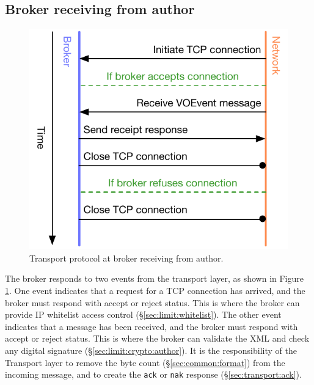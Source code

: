\documentclass[a4paper,11pt]{ivoa}
\begin{document}
\subsection{Broker receiving from author}

\begin{figure}[H]
  \begin{center}
  \includegraphics{figures/brokerfromauthor.pdf}
  \end{center}

  \caption{Transport protocol at broker receiving from author.}

  \label{fig:protocol:brokerfromauthor}
\end{figure}

The broker responds to two events from the transport layer, as shown in Figure
\ref{fig:protocol:brokerfromauthor}. One event indicates that a request for a
TCP connection has arrived, and the broker must respond with accept or reject
status. This is where the broker can provide IP whitelist access control
(\S\ref{sec:limit:whitelist}). The other event indicates that a message has
been received, and the broker must respond with accept or reject status. This
is where the broker can validate the XML and check any digital signature
(\S\ref{sec:limit:crypto:author}). It is the responsibility of the Transport
layer to remove the byte count (\S\ref{sec:common:format}) from the incoming
message, and to create the \texttt{ack} or \texttt{nak} response
(\S\ref{sec:transport:ack}).
\end{document}
